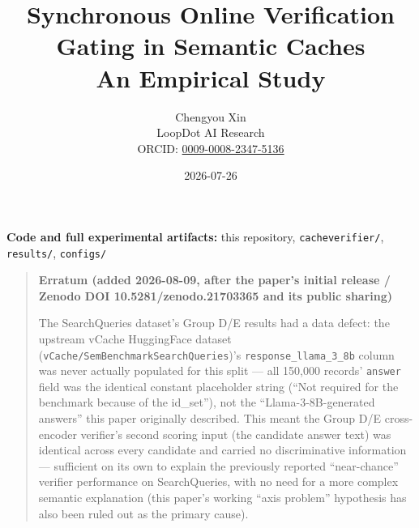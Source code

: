 \documentclass[11pt]{article}
\title{\textbf{Synchronous Online Verification Gating in Semantic Caches}\\[6pt]
  {\Large\normalfont An Empirical Study}}
\author{Chengyou Xin \\[4pt] LoopDot AI Research \\[4pt] ORCID: \href{https://orcid.org/0009-0008-2347-5136}{0009-0008-2347-5136}}
\date{2026-07-26}
\begin{document}
\maketitle
\thispagestyle{plain}

\begin{center}
\small\textbf{Code and full experimental artifacts:} this repository, \texttt{cacheverifier/\allowbreak{}}, \texttt{results/\allowbreak{}}, \texttt{configs/\allowbreak{}}
\end{center}
\vspace{4pt}

\begin{quote}
\noindent\textbf{Erratum (added 2026-08-09, after the paper's initial release / Zenodo DOI 10.5281/zenodo.21703365 and its public sharing)}

\noindent The SearchQueries dataset's Group D/E results had a data defect: the upstream vCache HuggingFace dataset (\texttt{v\allowbreak{}Cache/\allowbreak{}Sem\allowbreak{}Benchmark\allowbreak{}Search\allowbreak{}Queries})'s \texttt{response\_\allowbreak{}llama\_\allowbreak{}3\_\allowbreak{}8b} column was never actually populated for this split --- all 150,000 records' \texttt{answer} field was the identical constant placeholder string (``Not required for the benchmark because of the id\_set''), not the ``Llama-3-8B-generated answers'' this paper originally described. This meant the Group D/E cross-encoder verifier's second scoring input (the candidate answer text) was identical across every candidate and carried no discriminative information --- sufficient on its own to explain the previously reported ``near-chance'' verifier performance on SearchQueries, with no need for a more complex semantic explanation (this paper's working ``axis problem'' hypothesis has also been ruled out as the primary cause).


\end{quote}
\end{document}

